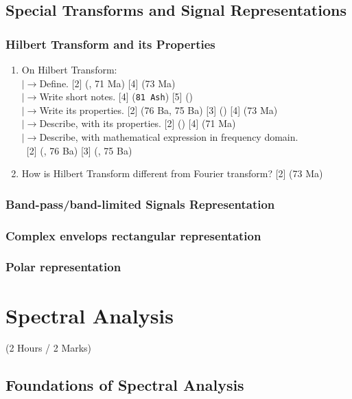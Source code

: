 \documentclass[12pt]{article}
\newcommand{\lb}{\\$\left|\rightarrow\right.$}
\newcommand{\enter}{\\\textcolor{white}{1}}
\begin{document}
  \subsection{Special Transforms and Signal Representations}
    \subsubsection{Hilbert Transform and its Properties}
      \begin{enumerate}
        \item On Hilbert Transform:
        \lb Define. \hfill [2] (, 71 Ma) [4] (73 Ma)
        \lb Write short notes. \hfill [4] (\texttt{81 Ash}) [5] ()
        \lb Write its properties. \hfill [2] (76 Ba, 75 Ba) [3] () [4] (73 Ma)
        \lb Describe, with its properties. \hfill [2] () [4] (71 Ma)
        \lb Describe, with mathematical expression in frequency domain.
        \enter\hfill [2] (, 76 Ba) [3] (, 75 Ba)

        \item How is Hilbert Transform different from Fourier transform? \hfill [2] (73 Ma)
      \end{enumerate}

    \subsubsection{Band-pass/band-limited Signals Representation}
    \subsubsection{Complex envelops rectangular representation}
    \subsubsection{Polar representation}

\pagebreak

\section{Spectral Analysis}
  \begin{center}(2 Hours / 2 Marks)\end{center}

  \subsection{Foundations of Spectral Analysis}
\end{document}
